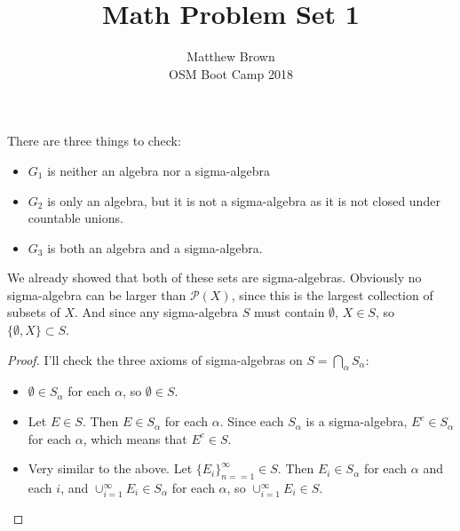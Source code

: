 \documentclass[12pt]{article}
\newenvironment{problem}[2][Problem]{\begin{trivlist}
\item[\hskip \labelsep {\bfseries #1}\hskip \labelsep {\bfseries #2.}]}{\end{trivlist}}
\theoremstyle{definition}
\theoremstyle{definition}
\theoremstyle{definition}
\theoremstyle{definition}
\begin{document}
\title{Math Problem Set 1}
\author{Matthew Brown\\ 
OSM Boot Camp 2018} %
 
\maketitle
 
\begin{problem}{1.3}
There are three things to check:
\begin{itemize}
\item $G_1$ is neither an algebra nor a sigma-algebra
\item $G_2$ is only an algebra, but it is not a sigma-algebra as it is not closed under countable unions.
\item $G_3$ is both an algebra and a sigma-algebra. 
\end{itemize}
\end{problem}

\begin{problem}{1.7} We already showed that both of these sets are sigma-algebras. Obviously no sigma-algebra can be larger than $\mathcal{P}(X)$, since this is the largest collection of subsets of $X$. And since any sigma-algebra $S$ must contain $\emptyset$, $X \in S$, so $\{ \emptyset, X \} \subset S $.
\end{problem}

\begin{problem}{1.10}
\begin{proof}
I'll check the three axioms of sigma-algebras on $S = \bigcap_\alpha S_\alpha$:
\begin{itemize}
\item $\emptyset \in S_\alpha$ for each $\alpha$, so $\emptyset \in S$.
\item Let $E \in S$. Then $E \in S_\alpha$ for each $\alpha$. Since each $S_\alpha$ is a sigma-algebra, $E^c \in S_\alpha$ for each $\alpha$, which means that $E^c \in S$.
\item Very similar to the above. Let $\{E_i\}_{n==1}^{\infty} \in S$. Then ${E_i} \in S_\alpha$ for each $\alpha$ and each $i$, and $\cup_{i=1}^\infty E_i \in S_\alpha$ for each $\alpha$, so $\cup_{i=1}^\infty E_i \in S$.
\end{itemize}
\end{proof}
\end{problem}
\end{document}
